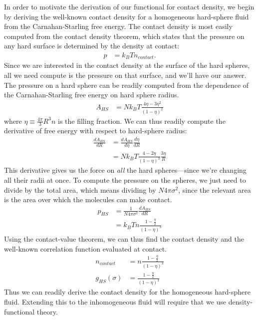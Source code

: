 \documentclass[letterpaper,twocolumn,amsmath,amssymb,jcp,10pt,aip]{revtex4-1}
\newcommand{\derivation}[1]{} %
\begin{document}
In order to motivate the derivation of our functional for contact
density, we begin by deriving the well-known contact density for a
homogeneous hard-sphere fluid from the Carnahan-Starling free energy.
The contact density is most easily computed from the contact density
theorem, which states that the pressure on any hard surface is
determined by the density at contact:
\begin{align}
  p &= k_BT n_\textit{contact}.
\end{align}
Since we are interested in the contact density at the surface of the
hard spheres, all we need compute is the pressure on that surface, and
we'll have our answer.  The pressure on a hard sphere can be readily
computed from the dependence of the Carnahan-Starling free energy on
hard sphere radius.
\begin{align}
  A_{HS} &= Nk_BT \frac{4\eta - 3\eta^2}{(1-\eta)^2}
\end{align}
where $\eta \equiv \frac{4\pi}{3} R^3 n$ is the filling fraction.  We
can thus readily compute the derivative of free energy with respect to
hard-sphere radius:
\begin{align}
  \frac{dA_{HS}}{dR} &= \frac{dA_{HS}}{d\eta} \frac{d\eta}{dR} \\
  \derivation{
    &= Nk_BT \left( \frac{4 - 6\eta}{(1-\eta)^2} + 2 \frac{4\eta - 3\eta^2}{(1-\eta)^3} \right) \frac{d\eta}{dR}
    \\
    &= Nk_BT \frac{4 - 4\eta - 6\eta + 6\eta^2 + 8\eta - 6\eta^2}{(1-\eta)^3} \frac{d\eta}{dR}
    \\
    &= Nk_BT \frac{4 - 2\eta}{(1-\eta)^3} \frac{d\eta}{dR}
    \\
  }
  &= Nk_BT \frac{4 - 2\eta}{(1-\eta)^3} \frac{3 \eta}{R} \label{eq:dAhsdR}
\end{align}
This derivative gives us the force on \emph{all} the hard
spheres---since we're changing all their radii at once.  To compute
the pressure on the spheres, we just need to divide by the total area,
which means dividing by $N 4\pi \sigma^2$, since the relevant area
is the area over which the molecules can make contact.
\begin{align}
  p_{HS} &= \frac{1}{N 4\pi \sigma^2} \frac{dA_{HS}}{dR} \\
  \derivation{
    &= \frac14 \frac{1}{N 4\pi R^2} Nk_BT \frac{4 - 2\eta}{(1-\eta)^3} \frac{3 \eta}{R} \\
    &= \frac{3}{4\pi R^3} \eta k_BT \frac{1 -
      \frac{\eta}2}{(1-\eta)^3} \\
  }
  &= k_BT n \frac{1 - \frac{\eta}2}{(1-\eta)^3}
\end{align}
Using the contact-value theorem, we can thus find the contact density
and the well-known correlation function evaluated at contact.
\begin{align}
  n_\textit{contact} &= n \frac{1 - \frac{\eta}2}{(1-\eta)^3} \\
  g_{HS}(\sigma) &= \frac{1 - \frac{\eta}2}{(1-\eta)^3}
\end{align}
Thus we can readily derive the contact density for the homogeneous
hard-sphere fluid.  Extending this to the inhomogeneous fluid will
require that we use density-functional theory.
\end{document}
